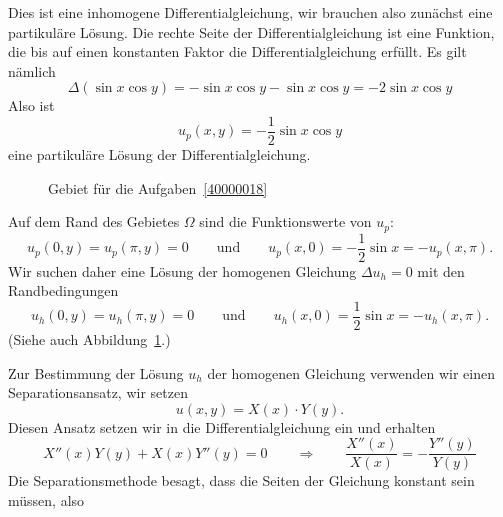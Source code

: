 \begin{loesung}
\begin{teilaufgaben}
\item
Dies ist eine inhomogene Differentialgleichung, wir brauchen also zunächst
eine partikuläre Lösung.
Die rechte Seite der Differentialgleichung ist eine Funktion, die bis auf
einen konstanten Faktor die Differentialgleichung erfüllt.
Es gilt nämlich
\[
\Delta (\sin x\cos y)
=
-\sin x\cos y - \sin x\cos y
=
-2 \sin x\cos y
\]
Also ist
\[
u_p(x,y)
=
-\frac{1}{2} \sin x\cos y
\]
eine partikuläre Lösung der Differentialgleichung.

\item
\begin{figure}
\centering
{}
\caption{Gebiet für die Aufgaben~\ref{40000018}
\label{40000018:gebiet}}
\end{figure}
Auf dem Rand des Gebietes $\Omega$ sind die Funktionswerte von $u_p$:
\[
u_p(0,y) = u_p(\pi,y)=0
\qquad\text{und}\qquad
u_p(x,0) = -\frac12\sin x = -u_p(x,\pi).
\]
Wir suchen daher eine Lösung der homogenen Gleichung $\Delta u_h = 0$
mit den Randbedingungen
\[
u_h(0,y) = u_h(\pi,y) = 0
\qquad\text{und}\qquad
u_h(x,0) = \frac12\sin x = -u_h(x,\pi).
\]
(Siehe auch Abbildung~\ref{40000018:gebiet}.)
\item
Zur Bestimmung der Lösung $u_h$ der homogenen Gleichung verwenden wir einen
Separationsansatz, wir setzen
\[
u(x,y) = X(x)\cdot Y(y).
\]
Diesen Ansatz setzen wir in die Differentialgleichung ein und erhalten
\[
X''(x)Y(y) + X(x)Y''(y)=0
\qquad\Rightarrow\qquad
\frac{X''(x)}{X(x)} = -\frac{Y''(y)}{Y(y)}
\]
Die Separationsmethode besagt, dass die Seiten der Gleichung konstant
sein müssen, also

\end{teilaufgaben}
\end{loesung}
